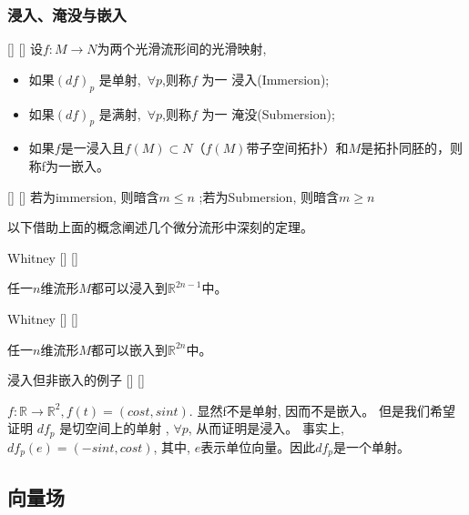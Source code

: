 \documentclass[UTF8]{ctexart}
\begin{document}
    \subsubsection{浸入、淹没与嵌入}
    \begin{dfn}
        []
        {}
        []
        []
        设$f : M \to N$为两个光滑流形间的光滑映射, 
     \begin{itemize}
        \item 如果$ (df)_p$ 是单射,\, $\forall p$,则称$f$ 为一 浸入(Immersion);
        \item 如果$ (df)_p$ 是满射,\, $\forall p$,则称$f$ 为一 淹没(Submersion);
        \item 如果$f$是一浸入且$f(M) \subset N$（$f(M)$带子空间拓扑）和$M$是拓扑同胚的，则称f为一嵌入。
    \end{itemize}
    \end{dfn}

    \begin{rmk}
        []
        {}
        []
        []
        若为immersion, 则暗含$m \leq n$ ;若为Submersion, 则暗含$m \geq n$
    \end{rmk}

    以下借助上面的概念阐述几个微分流形中深刻的定理。

    \begin{thm}
        []
        {Whitney}
        []
        []

        任一$n$维流形$M$都可以浸入到$\mathbb{R}^{2n−1}$中。
    \end{thm}

    \begin{thm}
        []
        {Whitney}
        []
        []

        任一$n$维流形$M$都可以嵌入到$\mathbb{R}^{2n}$中。
    \end{thm}

    \begin{xmp}
        []
        {浸入但非嵌入的例子}
        []
        []

        $f : \mathbb{R} \to \mathbb{R}^2 , f(t) = (cost , sint)$. 
        显然f不是单射, 因而不是嵌入。
        但是我们希望证明 $df_p$ 是切空间上的单射 , $\forall p$, 从而证明是浸入。
        事实上, $df_p(e) = (-sint , cost)$, 其中, $e$表示单位向量。因此$df_p$是一个单射。
    \end{xmp}

    \subsection{向量场}
    
\end{document}

